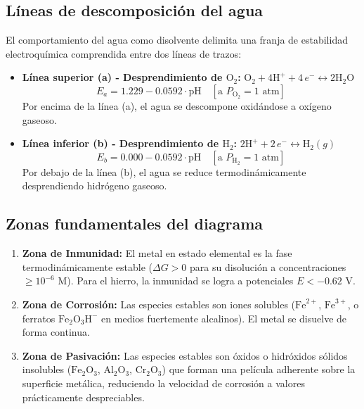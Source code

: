 \subsection{Líneas de descomposición del agua}
El comportamiento del agua como disolvente delimita una franja de estabilidad electroquímica comprendida entre dos líneas de trazos:
\begin{itemize}
    \item \textbf{Línea superior (a) - Desprendimiento de $\text{O}_2$:} $\text{O}_2 + 4\text{H}^+ + 4\,e^- \longleftrightarrow 2\text{H}_2\text{O}$
          \begin{equation}
              E_a = 1.229 - 0.0592 \cdot \text{pH} \quad [\text{a } P_{\text{O}_2} = 1\text{ atm}]
              \label{eq:linea_a_pourbaix}
          \end{equation}
          Por encima de la línea (a), el agua se descompone oxidándose a oxígeno gaseoso.
    \item \textbf{Línea inferior (b) - Desprendimiento de $\text{H}_2$:} $2\text{H}^+ + 2\,e^- \longleftrightarrow \text{H}_2(g)$
          \begin{equation}
              E_b = 0.000 - 0.0592 \cdot \text{pH} \quad [\text{a } P_{\text{H}_2} = 1\text{ atm}]
              \label{eq:linea_b_pourbaix}
          \end{equation}
          Por debajo de la línea (b), el agua se reduce termodinámicamente desprendiendo hidrógeno gaseoso.
\end{itemize}

\subsection{Zonas fundamentales del diagrama}
\begin{enumerate}
    \item \textbf{Zona de Inmunidad:} El metal en estado elemental es la fase termodinámicamente estable ($\Delta G > 0$ para su disolución a concentraciones $\geq 10^{-6}\text{ M}$). Para el hierro, la inmunidad se logra a potenciales $E < -0.62\text{ V}$.
    \item \textbf{Zona de Corrosión:} Las especies estables son iones solubles ($\text{Fe}^{2+}$, $\text{Fe}^{3+}$, o ferratos $\text{Fe}_2\text{O}_3\text{H}^-$ en medios fuertemente alcalinos). El metal se disuelve de forma continua.
    \item \textbf{Zona de Pasivación:} Las especies estables son óxidos o hidróxidos sólidos insolubles ($\text{Fe}_2\text{O}_3$, $\text{Al}_2\text{O}_3$, $\text{Cr}_2\text{O}_3$) que forman una película adherente sobre la superficie metálica, reduciendo la velocidad de corrosión a valores prácticamente despreciables.
\end{enumerate}

